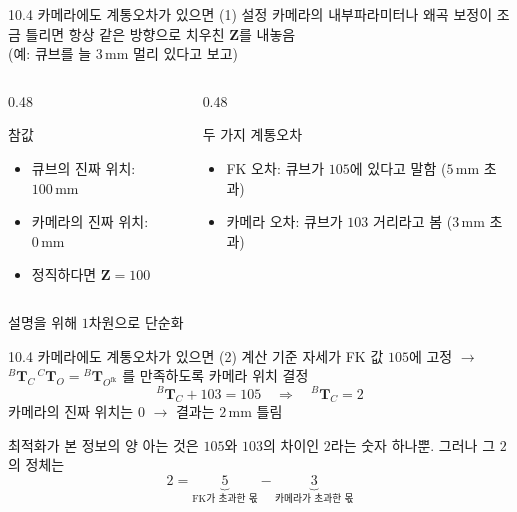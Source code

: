 \documentclass[aspectratio=169,11pt]{beamer}
\newcommand{\T}[3][]{{}^{#2}\mathbf{T}^{#1}_{#3}}   %
\newcommand{\Ofk}{O^{\mathrm{fk}}}     %
\begin{document}
\begin{frame}{10.4 카메라에도 계통오차가 있으면 (1) 설정}
  카메라의 내부파라미터나 왜곡 보정이 조금 틀리면
  항상 같은 방향으로 치우친 $\mathbf{Z}$를 내놓음\\
  (예: 큐브를 늘 $3\,\mathrm{mm}$ 멀리 있다고 보고)
  \vfill
  \begin{columns}[T]
    \begin{column}{0.48\textwidth}
      \begin{block}{참값}
        \begin{minipage}[t][22mm][t]{\linewidth}
          \begin{itemize}
            \item 큐브의 진짜 위치: $100\,\mathrm{mm}$
            \item 카메라의 진짜 위치: $0\,\mathrm{mm}$
            \item 정직하다면 $\mathbf{Z}=100$
          \end{itemize}
        \end{minipage}
      \end{block}
    \end{column}
    \begin{column}{0.48\textwidth}
      \begin{block}{두 가지 계통오차}
        \begin{minipage}[t][22mm][t]{\linewidth}
          \begin{itemize}
            \item FK 오차: 큐브가 $105$에 있다고 말함 ($5\,\mathrm{mm}$ 초과)
            \item 카메라 오차: 큐브가 $103$ 거리라고 봄 ($3\,\mathrm{mm}$ 초과)
          \end{itemize}
        \end{minipage}
      \end{block}
    \end{column}
  \end{columns}
  \vfill
  \centering 설명을 위해 $1$차원으로 단순화
\end{frame}

\begin{frame}{10.4 카메라에도 계통오차가 있으면 (2) 계산}
  기준 자세가 FK 값 $105$에 고정 $\rightarrow$
  $\T{B}{C}\,\T{C}{O}=\T{B}{\Ofk}$ 를 만족하도록 카메라 위치 결정
  \[
    \T{B}{C}+103=105
    \quad\Longrightarrow\quad
    \T{B}{C}=2
  \]
  카메라의 진짜 위치는 $0$ $\rightarrow$ 결과는 $2\,\mathrm{mm}$ 틀림
  \vfill
  \begin{alertblock}{최적화가 본 정보의 양}
    아는 것은 $105$와 $103$의 차이인 $2$라는 숫자 하나뿐.
    그러나 그 $2$의 정체는
    \[
      2 = \underbrace{5}_{\text{FK가 초과한 몫}} - \underbrace{3}_{\text{카메라가 초과한 몫}}
    \]
  \end{alertblock}
\end{frame}
\end{document}
